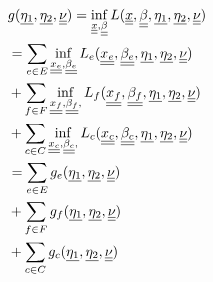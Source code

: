 \documentclass[conference]{IEEEtran}
\begin{document}
    \begin{subequations}
      \begin{align}
        & \notag g(\underline {\eta_1}, \underline {\eta_2}, \underline{\underline \nu}) = \inf_{\underline{\underline x}, \underline{\underline \beta}}L(\underline{\underline x}, \underline{\underline \beta}, \underline{\eta_1},\underline{\eta_2}, \underline{\underline \nu}) \\
        & \notag = \sum_{e \in E}\inf_{\underline{\underline {x_e}}, \underline{\underline {\beta_e}}}L_e(\underline{\underline {x_e}}, \underline{\underline {\beta_e}}, \underline {\eta_1}, \underline {\eta_2}, \underline{\underline \nu}) \\
        & \notag + \sum_{f \in F}\inf_{\underline{\underline {x_f}}, \underline{\underline {\beta_f}},}L_f(\underline{\underline {x_f}}, \underline{\underline {\beta_f}}, \underline {\eta_1}, \underline {\eta_2}, \underline{\underline \nu}) \\
        & \notag + \sum_{c \in C}\inf_{\underline{\underline {x_c}}, \underline{\underline {\beta_c}},}L_c(\underline{\underline {x_c}}, \underline{\underline {\beta_c}}, \underline {\eta_1}, \underline {\eta_2}, \underline{\underline \nu}) \\
        & \notag = \sum_{e \in E}g_e(\underline {\eta_1}, \underline {\eta_2}, \underline{\underline \nu}) \\
        & \notag + \sum_{f \in F}g_f(\underline {\eta_1}, \underline {\eta_2}, \underline{\underline \nu}) \\
        & + \sum_{c \in C}g_c(\underline {\eta_1}, \underline {\eta_2}, \underline{\underline \nu})
      \end{align}
    \end{subequations}
\end{document}
